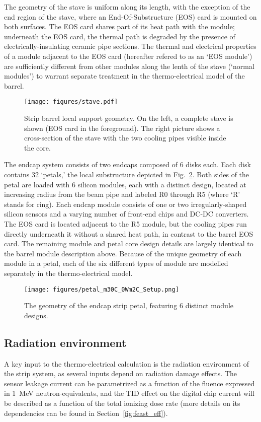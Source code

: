 The geometry of the stave is uniform along its length, with the exception of the end region of the stave, where an End-Of-Substructure (EOS) card is mounted on both surfaces. The EOS card shares part of its heat path with the module; underneath the EOS card, the thermal path is degraded by the presence of electrically-insulating ceramic pipe sections. The thermal and electrical properties of a module adjacent to the EOS card (hereafter refered to as an `EOS module') are sufficiently different from other modules along the lenth of the stave (`normal modules') to warrant separate treatment in the thermo-electrical model of the barrel.

\begin{figure}[ht]
\centering
\texttt{[image: figures/stave.pdf]}
\caption{Strip barrel local support geometry. On the left, a complete stave is shown (EOS card in the foreground). The right picture shows a cross-section of the stave with the two cooling pipes visible inside the core. }
\label{fig:barrelgeometry}
\end{figure}

The endcap system consists of two endcaps composed of 6 disks each.
Each disk contains 32 `petals,' the local substructure depicted in Fig.~\ref{fig:endcapgeometry}.
Both sides of the petal are loaded with 6 silicon modules, each with a distinct design,
located at increasing radius from the beam pipe and labeled R0 through R5 (where `R' stands for ring).
Each endcap module consists of one
or two irregularly-shaped silicon sensors and a varying number of front-end chips and DC-DC converters.
The EOS card is located adjacent to the R5 module, but the
cooling pipes run directly underneath it without a shared heat path, in contrast to the barrel EOS card.
The remaining module and petal core design details are largely identical to the barrel module description above.
Because of the unique geometry of each module in a petal, each of the six different types of module are
modelled separately in the thermo-electrical model.

\begin{figure}[ht]
\centering
\texttt{[image: figures/petal\_m30C\_0Wm2C\_Setup.png]}
\caption{The geometry of the endcap strip petal, featuring 6 distinct module designs.}
\label{fig:endcapgeometry}
\end{figure}

\subsection{Radiation environment}
A key input to the thermo-electrical calculation is the radiation environment of the strip system, as several inputs depend on radiation damage effects. The sensor leakage current can be parametrized as  a function of the fluence expressed in 1~MeV neutron-equivalents, and the TID effect on the digital chip current will be described as a function of the total ionizing dose rate (more details on its dependencies can be found in Section~\ref{fig:feast_eff}). 


